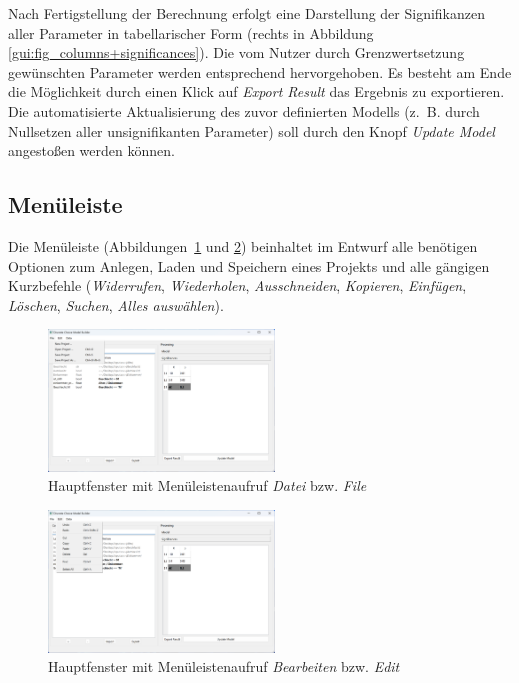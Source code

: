 \documentclass{article}
\begin{document}
Nach Fertigstellung der Berechnung erfolgt eine Darstellung der Signifikanzen aller Parameter in tabellarischer Form (rechts in Abbildung \ref{gui:fig_columns+significances}). Die vom Nutzer durch Grenzwertsetzung gewünschten Parameter werden entsprechend hervorgehoben. Es besteht am Ende die Möglichkeit durch einen Klick auf \emph{Export Result} das Ergebnis zu exportieren. Die automatisierte Aktualisierung des zuvor definierten Modells (z.~B. durch Nullsetzen aller unsignifikanten Parameter) soll durch den Knopf \emph{Update Model} angestoßen werden können.\\

\newpage
\subsection{Menüleiste}

Die Menüleiste (Abbildungen~\ref{gui:fig_menubar1-file} und \ref{gui:fig_menubar2-edit}) beinhaltet im Entwurf alle benötigen Optionen zum Anlegen, Laden und Speichern eines Projekts und alle gängigen Kurzbefehle (\emph{Widerrufen}, \emph{Wiederholen}, \emph{Ausschneiden}, \emph{Kopieren}, \emph{Einfügen}, \emph{Löschen}, \emph{Suchen}, \emph{Alles auswählen}).

\begin{figure}[H]%
  \centering
  \includegraphics[width=6cm,trim={0 12cm 18cm 0},clip]{specifications/img/gui-screenshots/menubar1-file.png}
  \caption{Hauptfenster mit Menüleistenaufruf \emph{Datei} bzw. \emph{File}}
  \label{gui:fig_menubar1-file}
\end{figure}

\begin{figure}[H]%
  \centering
  \includegraphics[width=6cm,trim={0 8cm 18cm 0},clip]{specifications/img/gui-screenshots/menubar2-edit.png}
  \caption{Hauptfenster mit Menüleistenaufruf \emph{Bearbeiten} bzw. \emph{Edit}}
  \label{gui:fig_menubar2-edit}
\end{figure}
\end{document}
